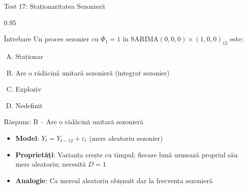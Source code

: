 \documentclass[9pt, aspectratio=169, t]{beamer}
\begin{document}
\begin{frame}{Test 17: Staționaritatea Sezonieră}
    \begin{cminipage}{0.95\textwidth}
    \begin{alertblock}{Întrebare}
        Un proces sezonier cu $\Phi_1 = 1$ în SARIMA$(0,0,0) \times (1,0,0)_{12}$ este:
    \end{alertblock}

    \vspace{0.3cm}

    \begin{enumerate}[A)]\setlength{\itemsep}{0pt}
        \item Staționar
        \item Are o rădăcină unitară sezonieră (integrat sezonier)
        \item Exploziv
        \item Nedefinit
    \end{enumerate}

    \vspace{0.5cm}
    \pause
    \begin{exampleblock}{Răspuns: B -- Are o rădăcină unitară sezonieră}
        {\small
        \begin{itemize}\setlength{\itemsep}{0pt}
        \item \textbf{Model}: $Y_t = Y_{t-12} + \varepsilon_t$ (mers aleatoriu sezonier)
        \item \textbf{Proprietăți}: Varianța crește cu timpul; fiecare lună urmează propriul său mers aleatoriu; necesită $D = 1$
        \item \textbf{Analogie}: Ca mersul aleatoriu obișnuit dar la frecvența sezonieră
        \end{itemize}
        }
    \end{exampleblock}
    \end{cminipage}
\end{frame}
\end{document}
